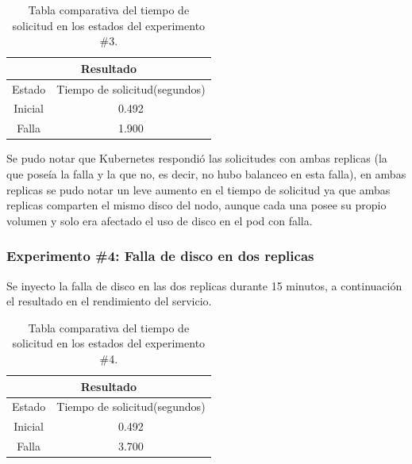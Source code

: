 \begin{table}[ht!]
\begin{center}
\begin{tabular}{ |c|c| } 
 \hline
 \multicolumn{2}{|c|}{Resultado} \\
 \hline
 \hline
 Estado & Tiempo de solicitud(segundos)\\
 \hline
 Inicial & 0.492\\
 Falla & 1.900\\
 \hline
\end{tabular}
\end{center}
\caption{Tabla comparativa del tiempo de solicitud en los estados del experimento \#3.}
\label{tab:tabla47}
\end{table}

\par Se pudo notar que Kubernetes respondió las solicitudes con ambas replicas (la que poseía la falla y la que no, es decir, no hubo balanceo en esta falla), en ambas replicas se pudo notar un leve aumento en el tiempo de solicitud ya que ambas replicas comparten el mismo disco del nodo, aunque cada una posee su propio volumen y solo era afectado el uso de disco en el pod con falla.\\

\subsubsection{Experimento \#4: Falla de disco en dos replicas}

\par Se inyecto la falla de disco en las dos replicas durante 15 minutos, a continuación el resultado en el rendimiento del servicio.\\

\begin{table}[ht!]
\begin{center}
\begin{tabular}{ |c|c| } 
 \hline
 \multicolumn{2}{|c|}{Resultado} \\
 \hline
 \hline
 Estado & Tiempo de solicitud(segundos)\\
 \hline
 Inicial & 0.492\\
 Falla & 3.700\\
 \hline
\end{tabular}
\end{center}
\caption{Tabla comparativa del tiempo de solicitud en los estados del experimento \#4.}
\label{tab:tabla48}
\end{table}

